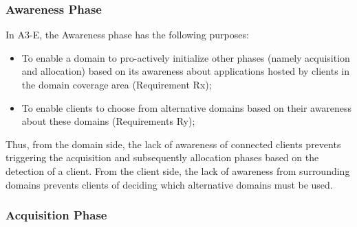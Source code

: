 \subsubsection{Awareness Phase}\label{sec:A3-E-awareness}


In A3-E, the Awareness phase has the following purposes:

\begin{itemize}
	
	\item To enable a domain to pro-actively initialize other phases (namely acquisition and allocation) based on its awareness about  applications hosted by clients in the domain coverage area (Requirement Rx);
	
	\item To enable clients to choose from alternative domains based on their awareness about these domains (Requirements Ry);
	
\end{itemize}

Thus, from the domain side, the lack of awareness of connected clients prevents triggering the acquisition and subsequently allocation phases based on the detection of a client. From the client side, the lack of awareness from surrounding domains prevents clients of deciding which alternative domains must be used. %

\subsubsection{Acquisition Phase}\label{sec:A3-E-acquisition}

